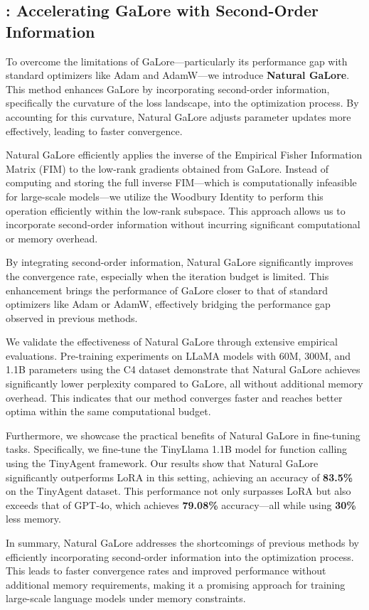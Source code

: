\subsection{\lowrank{}: Accelerating GaLore with Second-Order Information}

 To overcome the limitations of GaLore—particularly its performance gap with standard optimizers like Adam and AdamW—we introduce \textbf{Natural GaLore}. This method enhances GaLore by incorporating second-order information, specifically the curvature of the loss landscape, into the optimization process. By accounting for this curvature, Natural GaLore adjusts parameter updates more effectively, leading to faster convergence.

 Natural GaLore efficiently applies the inverse of the Empirical Fisher Information Matrix (FIM) to the low-rank gradients obtained from GaLore. Instead of computing and storing the full inverse FIM—which is computationally infeasible for large-scale models—we utilize the Woodbury Identity to perform this operation efficiently within the low-rank subspace. This approach allows us to incorporate second-order information without incurring significant computational or memory overhead.

 By integrating second-order information, Natural GaLore significantly improves the convergence rate, especially when the iteration budget is limited. This enhancement brings the performance of GaLore closer to that of standard optimizers like Adam or AdamW, effectively bridging the performance gap observed in previous methods.

 We validate the effectiveness of Natural GaLore through extensive empirical evaluations. Pre-training experiments on LLaMA models with 60M, 300M, and 1.1B parameters using the C4 dataset demonstrate that Natural GaLore achieves significantly lower perplexity compared to GaLore, all without additional memory overhead. This indicates that our method converges faster and reaches better optima within the same computational budget.

 Furthermore, we showcase the practical benefits of Natural GaLore in fine-tuning tasks. Specifically, we fine-tune the TinyLlama 1.1B model for function calling using the TinyAgent framework. Our results show that Natural GaLore significantly outperforms LoRA in this setting, achieving an accuracy of \textbf{83.5\%} on the TinyAgent dataset. This performance not only surpasses LoRA but also exceeds that of GPT-4o, which achieves \textbf{79.08\%} accuracy—all while using \textbf{30\%} less memory.

 In summary, Natural GaLore addresses the shortcomings of previous methods by efficiently incorporating second-order information into the optimization process. This leads to faster convergence rates and improved performance without additional memory requirements, making it a promising approach for training large-scale language models under memory constraints.




